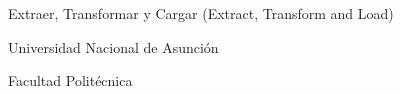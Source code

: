
\item[$ETL$] Extraer, Transformar y Cargar (Extract, Transform and Load)
\item[UNA] Universidad Nacional de Asunción
\item[FP-UNA] Facultad Politécnica
